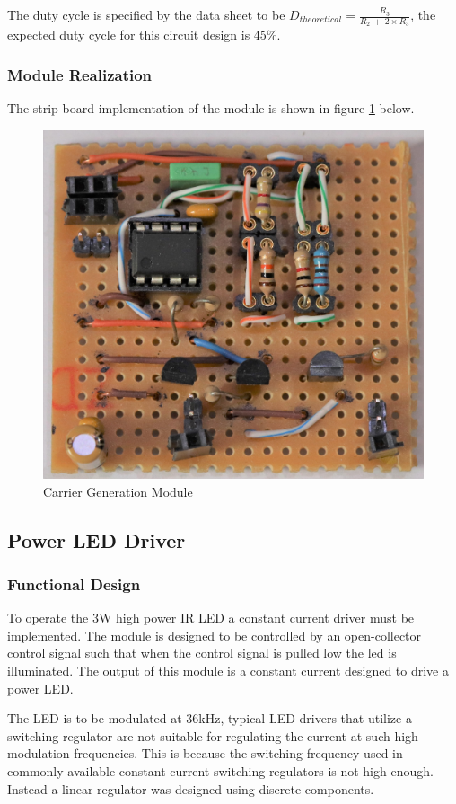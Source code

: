 The duty cycle is specified by the data sheet to be \(D_{theoretical} = \frac{R_3}{R_2\: +\: 2\times R_3}\), the expected duty cycle for this circuit design is 45\%.

\subsubsection{Module Realization}
The strip-board implementation of the module is shown in figure \ref{fig:module_carrier_generation} below.

\begin{figure}[H]
	\centering
	\includegraphics[width=.6\textwidth]{figures/modules/carrier_generator.jpg}
	\caption{Carrier Generation Module}
	\label{fig:module_carrier_generation}
\end{figure}






\subsection{Power LED Driver}

\subsubsection{Functional Design}
To operate the 3W high power IR LED a constant current driver must be implemented. The module is designed to be controlled by an open-collector control signal such that when the control signal is pulled low the led is illuminated. The output of this module is a constant current designed to drive a power LED.

The LED is to be modulated at 36kHz, typical LED drivers that utilize a switching regulator are not suitable for regulating the current at such high modulation frequencies. This is because the switching frequency used in commonly available constant current switching regulators is not high enough. Instead a linear regulator was designed using discrete components.

